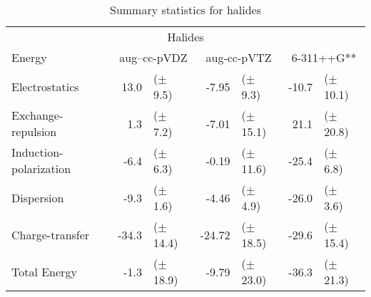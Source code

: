 \begin{table}[ht]
    \centering
    \small
    \begin{tabular}{l | r l | r l | r l}
        \hline
        \multicolumn{7}{c}{Halides} \tabularnewline
        \multicolumn{1}{l}{Energy} & \multicolumn{2}{c}{aug--cc-pVDZ} & 
            \multicolumn{2}{c}{aug-cc-pVTZ} & \multicolumn{2}{c}{6-311++G**}        \tabularnewline
        \hline
        Electrostatics          &  13.0 & ($\pm$  9.5)  &  -7.95    & ($\pm$  9.3)  & -10.7 & ($\pm$ 10.1)  \tabularnewline
        Exchange-repulsion      &   1.3 & ($\pm$  7.2)  &  -7.01    & ($\pm$ 15.1)  &  21.1 & ($\pm$ 20.8)  \tabularnewline
        Induction-polarization  &  -6.4 & ($\pm$  6.3)  &  -0.19    & ($\pm$ 11.6)  & -25.4 & ($\pm$  6.8)  \tabularnewline
        Dispersion              &  -9.3 & ($\pm$  1.6)  &  -4.46    & ($\pm$  4.9)  & -26.0 & ($\pm$  3.6)  \tabularnewline
        Charge-transfer         & -34.3 & ($\pm$ 14.4)  & -24.72    & ($\pm$ 18.5)  & -29.6 & ($\pm$ 15.4)  \tabularnewline
        Total Energy            &  -1.3 & ($\pm$ 18.9)  &  -9.79    & ($\pm$ 23.0)  & -36.3 & ($\pm$ 21.3)  \tabularnewline
        \hline
    \end{tabular}
    \caption{Summary statistics for halides}
    \label{tab:hal_sum_stats}
\end{table}

